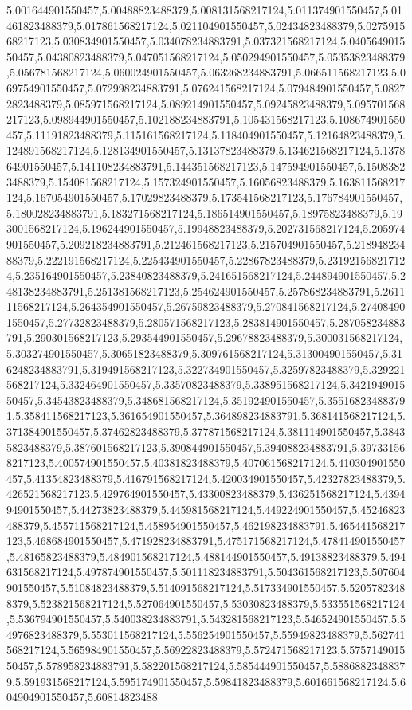 5.001644901550457,5.00488823488379,5.008131568217124,5.011374901550457,5.01461823488379,5.017861568217124,5.021104901550457,5.02434823488379,5.027591568217123,5.030834901550457,5.034078234883791,5.037321568217124,5.040564901550457,5.04380823488379,5.047051568217124,5.050294901550457,5.05353823488379,5.056781568217124,5.060024901550457,5.063268234883791,5.066511568217123,5.069754901550457,5.072998234883791,5.076241568217124,5.079484901550457,5.08272823488379,5.085971568217124,5.089214901550457,5.09245823488379,5.095701568217123,5.098944901550457,5.102188234883791,5.105431568217123,5.108674901550457,5.11191823488379,5.115161568217124,5.118404901550457,5.12164823488379,5.124891568217124,5.128134901550457,5.13137823488379,5.134621568217124,5.137864901550457,5.141108234883791,5.144351568217123,5.147594901550457,5.15083823488379,5.154081568217124,5.157324901550457,5.16056823488379,5.163811568217124,5.167054901550457,5.17029823488379,5.173541568217123,5.176784901550457,5.180028234883791,5.183271568217124,5.186514901550457,5.18975823488379,5.193001568217124,5.196244901550457,5.19948823488379,5.202731568217124,5.205974901550457,5.209218234883791,5.212461568217123,5.215704901550457,5.21894823488379,5.222191568217124,5.225434901550457,5.22867823488379,5.231921568217124,5.235164901550457,5.23840823488379,5.241651568217124,5.244894901550457,5.248138234883791,5.251381568217123,5.254624901550457,5.257868234883791,5.261111568217124,5.264354901550457,5.26759823488379,5.270841568217124,5.274084901550457,5.27732823488379,5.280571568217123,5.283814901550457,5.287058234883791,5.290301568217123,5.293544901550457,5.29678823488379,5.300031568217124,5.303274901550457,5.30651823488379,5.309761568217124,5.313004901550457,5.316248234883791,5.319491568217123,5.322734901550457,5.32597823488379,5.329221568217124,5.332464901550457,5.33570823488379,5.338951568217124,5.342194901550457,5.34543823488379,5.348681568217124,5.351924901550457,5.355168234883791,5.358411568217123,5.361654901550457,5.364898234883791,5.368141568217124,5.371384901550457,5.37462823488379,5.377871568217124,5.381114901550457,5.38435823488379,5.387601568217123,5.390844901550457,5.394088234883791,5.397331568217123,5.400574901550457,5.40381823488379,5.407061568217124,5.410304901550457,5.41354823488379,5.416791568217124,5.420034901550457,5.42327823488379,5.426521568217123,5.429764901550457,5.43300823488379,5.436251568217124,5.439494901550457,5.44273823488379,5.445981568217124,5.449224901550457,5.45246823488379,5.455711568217124,5.458954901550457,5.462198234883791,5.465441568217123,5.468684901550457,5.471928234883791,5.475171568217124,5.478414901550457,5.48165823488379,5.484901568217124,5.488144901550457,5.49138823488379,5.494631568217124,5.497874901550457,5.501118234883791,5.504361568217123,5.507604901550457,5.51084823488379,5.514091568217124,5.517334901550457,5.52057823488379,5.523821568217124,5.527064901550457,5.53030823488379,5.533551568217124,5.536794901550457,5.540038234883791,5.543281568217123,5.546524901550457,5.54976823488379,5.553011568217124,5.556254901550457,5.55949823488379,5.562741568217124,5.565984901550457,5.56922823488379,5.572471568217123,5.575714901550457,5.578958234883791,5.582201568217124,5.585444901550457,5.58868823488379,5.591931568217124,5.595174901550457,5.59841823488379,5.601661568217124,5.604904901550457,5.60814823488